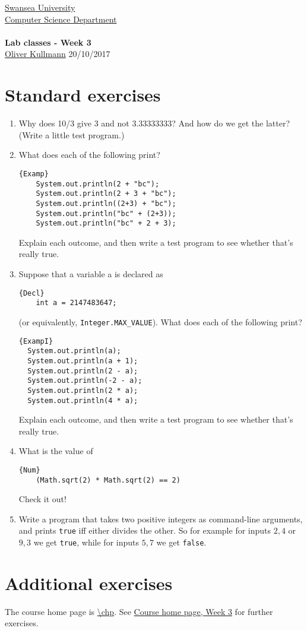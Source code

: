 \documentclass[11pt]{article}
\newcommand{\Java}{\lstset{language=Java,keywordstyle=\bfseries,breaklines,breakindent=30pt}}
\begin{document}
\begin{center}
  \href{http://www.swan.ac.uk/}{Swansea University}\\
  \href{http://www.swan.ac.uk/compsci/}{Computer Science Department}\\[1ex]
  \href{\chp}{\module}\\[1ex]
  \textbf{Lab classes - Week 3}\\
  \href{http://cs.swan.ac.uk/~csoliver}{Oliver Kullmann} 20/10/2017
\end{center}


\section{Standard exercises}
\label{sec:stdex}

\Java

\begin{enumerate}
\item Why does 10/3 give 3 and not 3.33333333? And how do we get the latter? (Write a little test program.)
\item What does each of the following print?
  \begin{lstlisting}{Examp}
    System.out.println(2 + "bc");
    System.out.println(2 + 3 + "bc");
    System.out.println((2+3) + "bc");
    System.out.println("bc" + (2+3));
    System.out.println("bc" + 2 + 3);
  \end{lstlisting}
  Explain each outcome, and then write a test program to see whether that's really true.
\item Suppose that a variable a is declared as
  \begin{lstlisting}{Decl}
    int a = 2147483647;
  \end{lstlisting}
  (or equivalently, \texttt{Integer.MAX\_VALUE}). What does each of the following print?
\begin{lstlisting}{ExampI}
  System.out.println(a);
  System.out.println(a + 1);
  System.out.println(2 - a);
  System.out.println(-2 - a);
  System.out.println(2 * a);
  System.out.println(4 * a);
  \end{lstlisting}
Explain each outcome, and then write a test program to see whether that's really true.
\item What is the value of
  \begin{lstlisting}{Num}
    (Math.sqrt(2) * Math.sqrt(2) == 2)
  \end{lstlisting}
  Check it out!
\item Write a program that takes two positive integers as command-line arguments, and prints \texttt{true} iff either divides the other. So for example for inputs $2,4$ or $9,3$ we get \texttt{true}, while for inputs $5,7$ we get \texttt{false}.
\end{enumerate}


\section{Additional exercises}
\label{sec:addex}

The course home page is \url{\chp}. See \href{\chp#ExercisesWeek03}{Course home page, Week 3} for further exercises.
\end{document}

